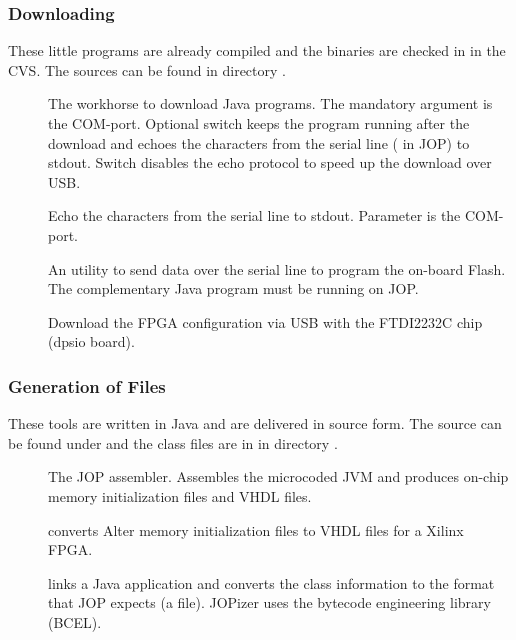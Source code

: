 \subsubsection{Downloading}

These little programs are already compiled and the binaries are
checked in in the CVS. The sources can be found in directory
.

\begin{description}
    \item[] The workhorse to download Java programs. The
    mandatory argument is the COM-port. Optional switch 
    keeps the program running after the download and echoes the
    characters from the serial line ( in JOP) to
    stdout. Switch  disables the echo protocol to speed up the
    download over USB.
    \item[] Echo the characters from the serial line to stdout.
    Parameter is the COM-port.
    \item[] An utility to send data over the serial line to program
    the on-board Flash. The complementary Java program
     must be running on JOP.
    \item[] Download the FPGA configuration via
    USB with the FTDI2232C chip (dpsio board).
\end{description}

\subsubsection{Generation of Files}

These tools are written in Java and are delivered in source form.
The source can be found under  and the class
files are in  in directory
.

\begin{description}
    \item[] The JOP assembler. Assembles the microcoded
    JVM and produces on-chip memory initialization files and VHDL
    files.
    \item[] converts Alter memory initialization files
    to VHDL files for a Xilinx FPGA.
    \item[] links a Java application and converts the
    class information to the format that JOP expects (a  file).
    JOPizer uses the bytecode engineering library (BCEL).

\end{description}

